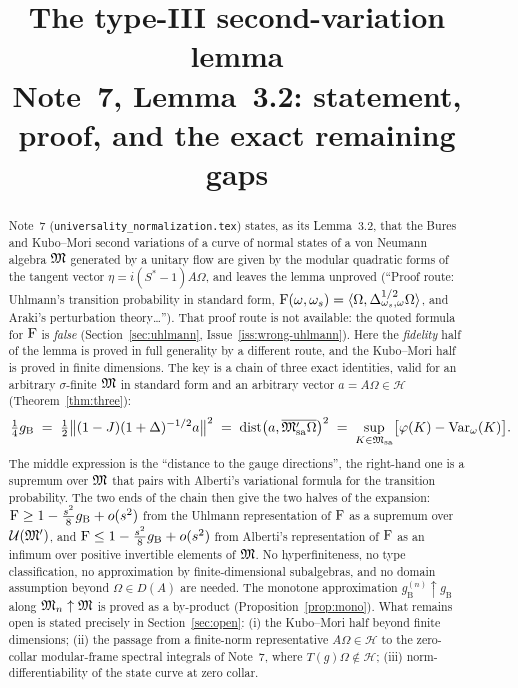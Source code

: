 \documentclass[11pt]{article}
\title{\color{navy}\bfseries The type-III second-variation lemma\\[0.3em]
\large Note~7, Lemma~3.2: statement, proof, and the exact remaining gaps}
\author{}\date{}
\newcommand{\Om}{\Omega}
\newcommand{\Hil}{\mathcal H}
\newcommand{\Msa}{\cM_{\mathrm{sa}}}
\newcommand{\Mpsa}{\cM'_{\mathrm{sa}}}
\newcommand{\Var}{\operatorname{Var}}
\newcommand{\dist}{\operatorname{dist}}
\newcommand{\gB}{g_{\mathrm B}}
\newcommand{\ip}[2]{\langle #1,#2\rangle}
\newcommand{\U}{\mathcal U}
\begin{document}
\maketitle
\vspace{-1.2em}

\begin{abstract}\noindent
Note~7 (\texttt{universality\_normalization.tex}) states, as its Lemma~3.2, that the Bures and Kubo--Mori
second variations of a curve of normal states of a von Neumann algebra $\mathfrak M$ generated by a unitary flow are
given by the modular quadratic forms of the tangent vector $\eta=i(S^*-1)A\Om$, and leaves the lemma unproved
(``Proof route: Uhlmann's transition probability in standard form,
$\Fid(\omega,\omega_s)=\ip{\Om}{\Delta_{\omega_s,\omega}^{1/2}\Om}$, and Araki's perturbation theory\dots'').
That proof route is not available: the quoted formula for $\operatorname{F}$ is \emph{false}
(Section~\ref{sec:uhlmann}, Issue~\ref{iss:wrong-uhlmann}).  Here the \emph{fidelity} half of the lemma is proved
in full generality by a different route, and the Kubo--Mori half is proved in finite dimensions.
The key is a chain of three exact identities, valid for an arbitrary $\sigma$-finite $\mathfrak M$ in standard form
and an arbitrary vector $a=A\Om\in\Hil$ (Theorem~\ref{thm:three}):
\[
 \tfrac14\gB\;=\;\tfrac12\bigl\|(1-J)(1+\Delta)^{-1/2}a\bigr\|^2
 \;=\;\dist\bigl(a,\overline{\Mpsa\Om}\bigr)^2
 \;=\;\sup_{K\in\Msa}\bigl[\varphi(K)-\Var_\omega(K)\bigr].
\]
The middle expression is the ``distance to the gauge directions'', the right-hand one is a supremum over
$\mathfrak M$ that pairs with Alberti's variational formula for the transition probability.  The two ends of the chain
then give the two halves of the expansion:
$\Fid\ge1-\frac{s^2}8\gB+o(s^2)$ from the Uhlmann representation of $\operatorname{F}$ as a supremum over
$\U(\cM')$, and $\Fid\le1-\frac{s^2}8\gB+o(s^2)$ from Alberti's representation of $\operatorname{F}$ as an infimum over
positive invertible elements of $\mathfrak M$.  No hyperfiniteness, no type classification, no
approximation by finite-dimensional subalgebras, and no domain assumption beyond $\Om\in D(A)$ are needed.
The monotone approximation $\gB^{(n)}\uparrow\gB$ along $\mathfrak M_n\uparrow\mathfrak M$ is proved as a by-product
(Proposition~\ref{prop:mono}).  What remains open is stated precisely in Section~\ref{sec:open}:
(i) the Kubo--Mori half beyond finite dimensions; (ii) the passage from a finite-norm representative
$A\Om\in\Hil$ to the zero-collar modular-frame spectral integrals of Note~7, where $T(g)\Om\notin\Hil$;
(iii) norm-differentiability of the state curve at zero collar.
\end{abstract}
\end{document}
